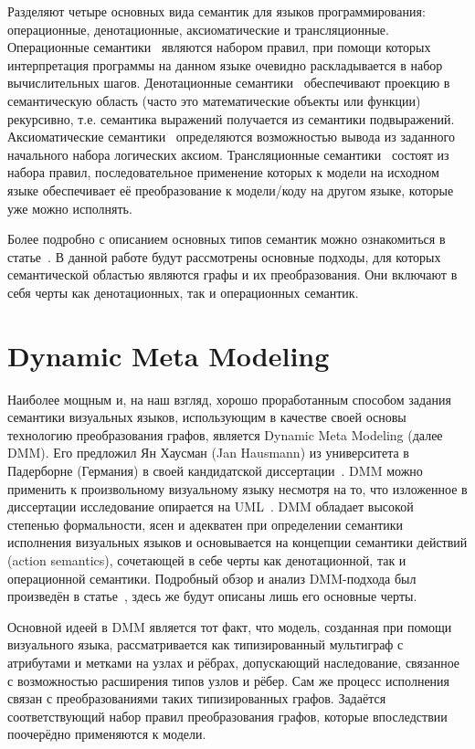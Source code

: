 \documentclass[a5paper]{article}
\begin{document}
Разделяют четыре основных вида семантик для языков программирования: операционные, денотационные, аксиоматические и трансляционные. Операционные семантики~\cite{sem2, sem3} являются набором правил, при помощи которых интерпретация программы на данном языке очевидно раскладывается в набор вычислительных шагов. Денотационные семантики~\cite{sem3} обеспечивают проекцию в семантическую область (часто это математические объекты или функции) рекурсивно, т.е. семантика выражений получается из семантики подвыражений. Аксиоматические семантики~\cite{sem1} определяются возможностью вывода из заданного начального набора логических аксиом. Трансляционные семантики~\cite{sem4} состоят из набора правил, последовательное применение которых к модели на исходном языке обеспечивает её преобразование к модели/коду на другом языке, которые уже можно исполнять.

Более подробно с описанием основных типов семантик можно ознакомиться в статье~\cite{part1}. В данной работе будут рассмотрены основные подходы, для которых семантической областью являются графы и их преобразования. Они включают в себя черты как денотационных, так и операционных семантик.

\section{Dynamic Meta Modeling}

Наиболее мощным и, на наш взгляд, хорошо проработанным способом задания семантики визуальных языков, использующим в качестве своей основы технологию преобразования графов, является Dynamic Meta Modeling (далее DMM). Его предложил Ян Хаусман (Jan Hausmann) из университета в Падерборне (Германия) в своей кандидатской диссертации~\cite{dmm1}. DMM можно применить к произвольному визуальному языку несмотря на то, что изложенное в диссертации исследование опирается на UML~\cite{uml}. DMM обладает высокой степенью формальности, ясен и адекватен при определении семантики исполнения визуальных языков и основывается на концепции семантики действий (action semantics), сочетающей в себе черты как денотационной, так и операционной семантики. Подробный обзор и анализ DMM-подхода был произведён в статье~\cite{part1}, здесь же будут описаны лишь его основные черты.

Основной идеей в DMM является тот факт, что модель, созданная при помощи визуального языка, рассматривается как типизированный мультиграф с атрибутами и метками на узлах и рёбрах, допускающий наследование, связанное с возможностью расширения типов узлов и рёбер. Сам же процесс исполнения связан с преобразованиями таких типизированных графов. Задаётся соответствующий набор правил преобразования графов, которые впоследствии поочерёдно применяются к модели.
\end{document}
